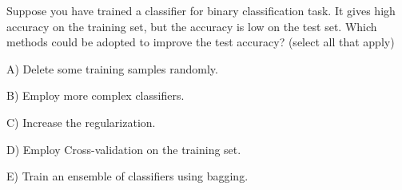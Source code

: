 Suppose you have trained a classifier for binary classification task. It gives high accuracy on the training set, but the accuracy is low on the test set. Which methods could be adopted to improve the test accuracy? (select all that apply)


A) Delete some training samples randomly.


B) Employ more complex classifiers.


C) Increase the regularization.


D) Employ Cross-validation on the training set.


E) Train an ensemble of classifiers using bagging.
